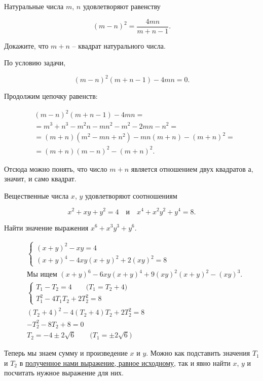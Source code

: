 

\begin{itemize}

\itB Натуральные числа $m$, $n$ удовлетворяют равенству

$$(m-n)^2=\frac{4mn}{m+n-1}.$$

Докажите, что $m+n$ -- квадрат натурального числа.

\itr По условию задачи,

$$(m-n)^2 (m+n-1) - 4mn = 0.$$

Продолжим цепочку равенств:

\begin{align*}
	& (m-n)^2 (m+n-1) - 4mn = \\
	& = m^3 + n^3 - m^2n - mn^2 - m^2 - 2mn - n^2 =\\
	& = (m+n)(m^2-mn+n^2) -mn(m+n) -(m+n)^2 = \\
	& = (m+n)(m-n)^2 -(m+n)^2.
\end{align*}

Отсюда можно понять, что число $m+n$ является отношением двух квадратов а, значит, и само квадрат.

\itC Вещественные числа $x$, $y$ удовлетворяют соотношениям

$$x^2+xy+y^2=4\quad\text{и}\quad x^4+x^2y^2+y^4=8.$$

Найти значение выражения $x^6+x^3y^3+y^6$.

\itr
\begin{align*}
& \begin{cases}
	(x+y)^2 - xy = 4 \\
	(x+y)^4 - 4xy(x+y)^2 + 2(xy)^2 = 8
\end{cases} \\
& \label{herestav} \text{Мы ищем $(x+y)^6 - 6xy(x+y)^4 + 9(xy)^2(x+y)^2 - (xy)^3$.} \\
& \begin{cases}
	T_1 - T_2 =4 \qquad \text{($T_1=T_2+4$)} \\
	T_1^2 - 4T_1T_2 + 2T_2^2 = 8
\end{cases} \\
	& (T_2+4)^2 - 4(T_2+4)T_2 + 2T_2^2 = 8 \\
	& -T_2^2 - 8 T_2 + 8 = 0 \\
	& T_2 = -4 \pm 2 \sqrt 6\qquad \text{($T_1 = \pm 2\sqrt 6$)}
\end{align*}

Теперь мы знаем сумму и произведение $x$ и $y$. Можно как подставить значения $T_1$ и $T_2$ в \hyperref[herestav]{полученное нами выражение, равное исходному}, так и явно найти $x$, $y$ и посчитать нужное выражение для них.

\end{itemize}

